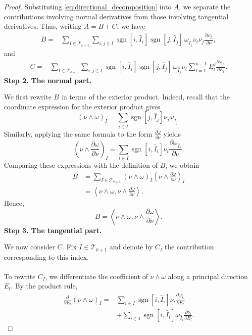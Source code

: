 \begin{proof}
Substituting \eqref{eq:directional_decomposition} into $A$, we
separate the contributions involving normal derivatives from those
involving tangential derivatives. Thus, writing $A=B+C$, we have
\[
\begin{aligned}
B={}&
\sum_{I\in\mathscr{T}_{k+1}}
\sum_{i,j\in I}
\operatorname{sgn}[i,\widehat I_i]
\operatorname{sgn}[j,\widehat I_j]
\,
\omega_{\widehat I_j}
\nu_i\nu_j
\frac{\partial\omega_{\widehat I_i}}{\partial\nu},
\end{aligned}
\]
and
\[
\begin{aligned}
C={}&
\sum_{I\in\mathscr{T}_{k+1}}
\sum_{i,j\in I}
\operatorname{sgn}[i,\widehat I_i]
\operatorname{sgn}[j,\widehat I_j]
\,
\omega_{\widehat I_j}
\nu_i
\sum_{l=1}^{n-1}
E_l^j
\frac{\partial\omega_{\widehat I_i}}{\partial E_l}.
\end{aligned}
\]
\textbf{Step 2. The normal part.}

We first rewrite $B$ in terms of the exterior product. Indeed, recall that
the coordinate expression for the exterior product gives
\[
(\nu\wedge\omega)_I
=
\sum_{j\in I}
\operatorname{sgn}[j,\widehat I_j]
\nu_j
\omega_{\widehat I_j}.
\]
Similarly, applying the same formula to the form
$\frac{\partial\omega}{\partial\nu}$ yields
\[
\left(\nu\wedge\frac{\partial\omega}{\partial\nu}\right)_I
=
\sum_{i\in I}
\operatorname{sgn}[i,\widehat I_i]
\nu_i
\frac{\partial\omega_{\widehat I_i}}{\partial\nu}.
\]
Comparing these expressions with the definition of $B$, we obtain
\[
\begin{aligned}
B
&=
\sum_{I\in\mathscr{T}_{k+1}}
(\nu\wedge\omega)_I
\left(\nu\wedge\frac{\partial\omega}{\partial\nu}\right)_I\\
&=
\left\langle
\nu\wedge\omega,
\nu\wedge\frac{\partial\omega}{\partial\nu}
\right\rangle.
\end{aligned}
\]
Hence,
\begin{equation}
\label{eq:B_identity}
B=
\left\langle
\nu\wedge\omega,
\nu\wedge\frac{\partial\omega}{\partial\nu}
\right\rangle.
\end{equation}
\textbf{Step 3. The tangential part.}

We now consider $C$. Fix $I\in\mathscr{T}_{k+1}$ and denote by
$C_I$ the contribution corresponding to this index. 
\\\\ To rewrite $C_I$, we differentiate the coefficient of
$\nu\wedge\omega$ along a principal direction $E_l$. By the product
rule,
\[
\begin{aligned}
\frac{\partial}{\partial E_l}
(\nu\wedge\omega)_I
={}&
\sum_{i\in I}
\operatorname{sgn}[i,\widehat I_i]
\nu_i
\frac{\partial\omega_{\widehat I_i}}{\partial E_l}
\\
&+
\sum_{i\in I}
\operatorname{sgn}[i,\widehat I_i]
\omega_{\widehat I_i}
\frac{\partial\nu_i}{\partial E_l}.
\end{aligned}
\]


\end{proof}
